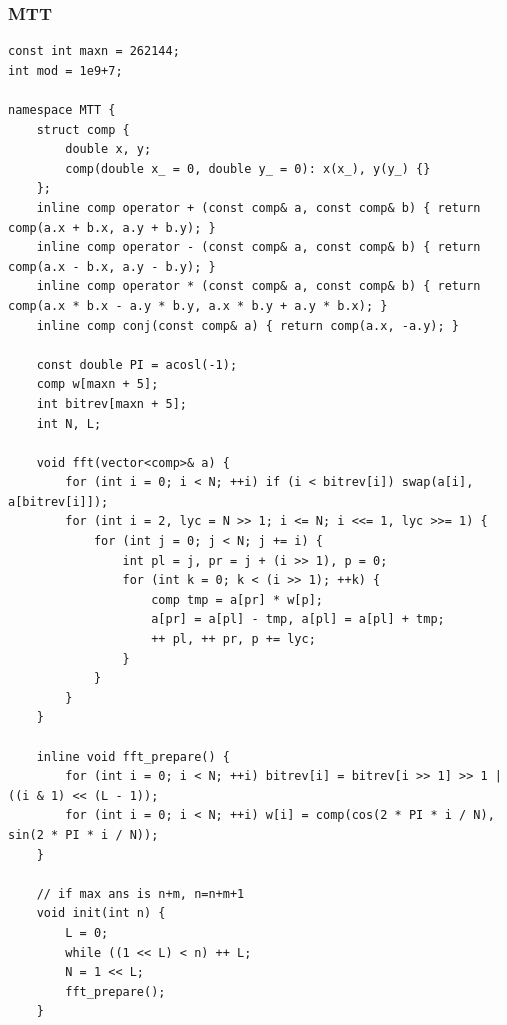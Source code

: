 \documentclass[twoside]{article}
\begin{document}
\subsubsection{MTT}
\begin{lstlisting}
const int maxn = 262144;
int mod = 1e9+7;

namespace MTT {
    struct comp {
        double x, y;
        comp(double x_ = 0, double y_ = 0): x(x_), y(y_) {}
    };
    inline comp operator + (const comp& a, const comp& b) { return comp(a.x + b.x, a.y + b.y); }
    inline comp operator - (const comp& a, const comp& b) { return comp(a.x - b.x, a.y - b.y); }
    inline comp operator * (const comp& a, const comp& b) { return comp(a.x * b.x - a.y * b.y, a.x * b.y + a.y * b.x); }
    inline comp conj(const comp& a) { return comp(a.x, -a.y); }

    const double PI = acosl(-1);
    comp w[maxn + 5];
    int bitrev[maxn + 5];
    int N, L;

    void fft(vector<comp>& a) {
        for (int i = 0; i < N; ++i) if (i < bitrev[i]) swap(a[i], a[bitrev[i]]);
        for (int i = 2, lyc = N >> 1; i <= N; i <<= 1, lyc >>= 1) {
            for (int j = 0; j < N; j += i) {
                int pl = j, pr = j + (i >> 1), p = 0;
                for (int k = 0; k < (i >> 1); ++k) {
                    comp tmp = a[pr] * w[p];
                    a[pr] = a[pl] - tmp, a[pl] = a[pl] + tmp;
                    ++ pl, ++ pr, p += lyc;
                }
            }
        }
    }

    inline void fft_prepare() {
        for (int i = 0; i < N; ++i) bitrev[i] = bitrev[i >> 1] >> 1 | ((i & 1) << (L - 1));
        for (int i = 0; i < N; ++i) w[i] = comp(cos(2 * PI * i / N), sin(2 * PI * i / N));
    }

    // if max ans is n+m, n=n+m+1
    void init(int n) {
        L = 0;
        while ((1 << L) < n) ++ L;
        N = 1 << L;
        fft_prepare();
    }


\end{lstlisting}
\end{document}
